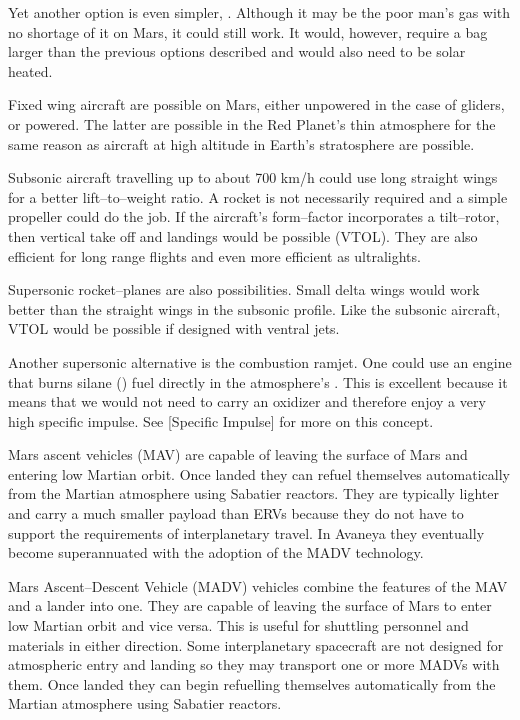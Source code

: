 Yet another option is even simpler, . Although it may be the poor man's gas with no shortage of it on Mars, it could still work. It would, however, require a bag larger than the previous options described and would also need to be solar heated.

Fixed wing aircraft are possible on Mars, either unpowered in the case of gliders, or powered. The latter are possible in the Red Planet's thin atmosphere for the same reason as aircraft at high altitude in Earth's stratosphere are possible.

Subsonic aircraft travelling up to about 700 km/h could use long straight wings for a better lift--to--weight ratio. A rocket is not necessarily required and a simple propeller could do the job. If the aircraft's form--factor incorporates a tilt--rotor, then vertical take off and landings would be possible (VTOL). They are also efficient for long range flights and even more efficient as ultralights.

Supersonic rocket--planes are also possibilities. Small delta wings would work better than the straight wings in the subsonic profile. Like the subsonic aircraft, VTOL would be possible if designed with ventral jets.

Another supersonic alternative is the combustion ramjet. One could use an engine that burns silane () fuel directly in the atmosphere's . This is excellent because it means that we would not need to carry an oxidizer and therefore enjoy a very high specific impulse. See [Specific Impulse] for more on this concept.

Mars ascent vehicles (MAV) are capable of leaving the surface of Mars and entering low Martian orbit. Once landed they can refuel themselves automatically from the Martian atmosphere using Sabatier reactors. They are typically lighter and carry a much smaller payload than ERVs because they do not have to support the requirements of interplanetary travel. In Avaneya they eventually become superannuated with the adoption of the MADV technology.

Mars Ascent--Descent Vehicle (MADV) vehicles combine the features of the MAV and a lander into one. They are capable of leaving the surface of Mars to enter low Martian orbit and vice versa. This is useful for shuttling personnel and materials in either direction. Some interplanetary spacecraft are not designed for atmospheric entry and landing so they may transport one or more MADVs with them. Once landed they can begin refuelling themselves automatically from the Martian atmosphere using Sabatier reactors.

